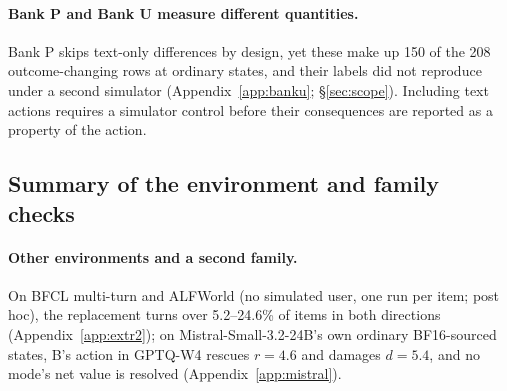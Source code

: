 \paragraph{Bank P and Bank U measure different quantities.} Bank P skips text-only differences by design, yet these make up 150 of the 208 outcome-changing rows at ordinary states, and their labels did not reproduce under a second simulator (Appendix~\ref{app:banku}; \S\ref{sec:scope}). Including text actions requires a simulator control before their consequences are reported as a property of the action. %


\subsection{Summary of the environment and family checks}

\paragraph{Other environments and a second family.} On BFCL multi-turn and ALFWorld (no simulated user, one run per item; post hoc), the replacement turns over 5.2--24.6\% of items in both directions (Appendix~\ref{app:extr2}); on Mistral-Small-3.2-24B's own ordinary BF16-sourced states, B's action in GPTQ-W4 rescues $r=4.6$ and damages $d=5.4$\pp{}, and no mode's net value is resolved (Appendix~\ref{app:mistral}). %


